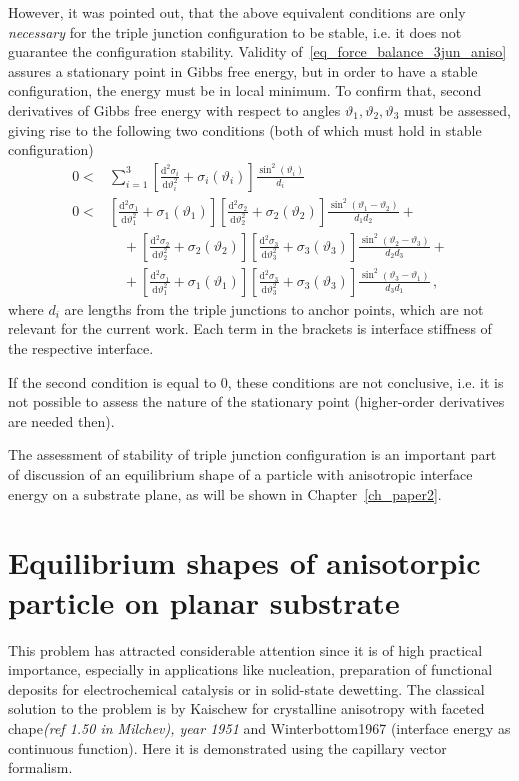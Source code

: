 However, it was pointed out, that the above equivalent conditions are only \textit{necessary} for the triple junction configuration to be stable, i.e. it does not guarantee the configuration stability. Validity of~\eqref{eq_force_balance_3jun_aniso} assures a stationary point in Gibbs free energy, but in order to have a stable configuration, the energy must be in local minimum. To confirm that, second derivatives of Gibbs free energy with respect to angles $\vartheta_1,\vartheta_2,\vartheta_3$ must be assessed, giving rise to the following two conditions (both of which must hold in stable configuration)
\begin{align} \label{eq_3jun_aniso_stabcond1}
    0 <& \sum_{i=1}^3 \left[ \frac{\mathrm{d}^2 \sigma_i}{\mathrm{d} \vartheta_i^2} + \sigma_i(\vartheta_i) \right]\frac{\sin^2(\vartheta_i)}{d_i} \\  \label{eq_3jun_aniso_stabcond2}
    0 <& \left[ \frac{\mathrm{d}^2 \sigma_1}{\mathrm{d} \vartheta_1^2} + \sigma_1(\vartheta_1) \right]\left[ \frac{\mathrm{d}^2 \sigma_2}{\mathrm{d} \vartheta_2^2} + \sigma_2(\vartheta_2) \right] \frac{\sin^2(\vartheta_1-\vartheta_2)}{d_1d_2} +    \\
     &\quad +\left[ \frac{\mathrm{d}^2 \sigma_2}{\mathrm{d} \vartheta_2^2} + \sigma_2(\vartheta_2) \right]\left[ \frac{\mathrm{d}^2 \sigma_3}{\mathrm{d} \vartheta_3^2} +  \sigma_3(\vartheta_3) \right] \frac{\sin^2(\vartheta_2-\vartheta_3)}{d_2d_3} + \nonumber \\
     &\quad + \left[ \frac{\mathrm{d}^2 \sigma_1}{\mathrm{d} \vartheta_1^2} + \sigma_1(\vartheta_1) \right]\left[ \frac{\mathrm{d}^2 \sigma_3}{\mathrm{d} \vartheta_3^2} + \sigma_3(\vartheta_3) \right]  \frac{\sin^2(\vartheta_3-\vartheta_1)}{d_3d_1} \nonumber \,,
\end{align}
where $d_i$ are lengths from the triple junctions to anchor points, which are not relevant for the current work. Each term in the brackets is interface stiffness of the respective interface.

If the second condition is equal to 0, these conditions are not conclusive, i.e. it is not possible to assess the nature of the stationary point (higher-order derivatives are needed then). 

The assessment of stability of triple junction configuration is an important part of discussion of an equilibrium shape of a particle with anisotropic interface energy on a substrate plane, as will be shown in Chapter~\ref{ch_paper2}.

\section{Equilibrium shapes of anisotorpic particle on planar substrate}
This problem has attracted considerable attention since it is of high practical importance, especially in applications like nucleation, preparation of functional deposits for electrochemical catalysis or in solid-state dewetting. The classical solution to the problem is by Kaischew for crystalline anisotropy with faceted chape\textit{(ref 1.50 in Milchev), year 1951} and Winterbottom1967 (interface energy as continuous function). Here it is demonstrated using the capillary vector formalism. 

